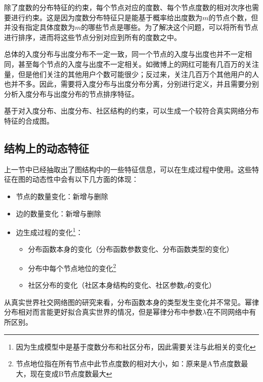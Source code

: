 除了度数的分布特征的约束，每个节点对应的度数、每个节点度数的相对次序也需要进行约束。这是因为度数分布特征只是能基于概率给出度数为$m$的节点个数，但并没有指定具体度数为$m$的哪些节点是哪些。为了解决这个问题，可以将所有节点进行排序，进而将这些节点分别对应到所有的度数之中。

总体的入度分布与出度分布不一定一致，同一个节点的入度与出度也并不一定相同，甚至每个节点的入度与出度不一定相关。如微博上的网红可能有几百万的关注量，但是他们关注的其他用户个数可能很少；反过来，关注几百万个其他用户的人也并不多。因此，需要将入度分布与出度分布分离，分别进行定义，并且需要分别分析入度分布与出度分布的节点排序特征。

基于对入度分布、出度分布、社区结构的约束，可以生成一个较符合真实网络分布特征的合成图。

\subsection{结构上的动态特征}

上一节中已经抽取出了图结构中的一些特征信息，可以在生成过程中使用。这些特征在图的动态性中会有以下几方面的体现：

\begin{itemize}
    \item 节点的数量变化：新增与删除
    \item 边的数量变化：新增与删除
    \item 边生成过程的变化\footnote{因为生成模型中是基于度数分布和社区分布，因此需要关注与此相关的变化}：
    \begin{itemize}
        \item 分布函数本身的变化（分布函数参数变化、分布函数类型的变化）
        \item 分布中每个节点地位的变化\footnote{节点地位指在所有节点中此节点度数的相对大小，如：原来是A节点度数最大，现在变成B节点度数最大}
        \item 社区分布的变化（社区本身结构的变化、社区参数$\rho$的变化）
    \end{itemize}
\end{itemize}

\vspace{0.2cm}

从真实世界社交网络图的研究来看，分布函数本身的类型发生变化并不常见。幂律分布相对而言能更好拟合真实世界的情况，但是幂律分布中参数$\lambda$在不同网络中有所区别。

